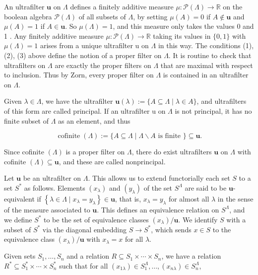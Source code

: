 \documentclass[10pt]{article}
\begin{document}
An ultrafilter $\mathbf{u}$ on $\Lambda$ defines a finitely additive measure $\mu: \mathcal{P}(\Lambda) \rightarrow \mathbb{R}$ on the boolean algebra $\mathcal{P}(\Lambda)$ of all subsets of $\Lambda$, by setting $\mu(A)=0$ if $A \notin \mathbf{u}$ and $\mu(A)=1$ if $A \in \mathbf{u}$. So $\mu(\Lambda)=1$, and this measure only takes the values 0 and 1 . Any finitely additive measure $\mu: \mathcal{P}(\Lambda) \rightarrow \mathbb{R}$ taking its values in $\{0,1\}$ with $\mu(\Lambda)=1$ arises from a unique ultrafilter u on $\Lambda$ in this way. The conditions (1), (2), (3) above define the notion of a proper filter on $\Lambda$. It is routine to check that ultrafilters on $\Lambda$ are exactly the proper filters on $\Lambda$ that are maximal with respect to inclusion. Thus by Zorn, every proper filter on $\Lambda$ is contained in an ultrafilter on $\Lambda$.

Given $\lambda \in \Lambda$, we have the ultrafilter $\mathbf{u}(\lambda):=\{A \subseteq \Lambda \mid \lambda \in A\}$, and ultrafilters of this form are called principal. If an ultrafilter u on $\Lambda$ is not principal, it has no finite subset of $\Lambda$ as an element, and thus

$$
\operatorname{cofinite}(\Lambda):=\{A \subseteq \Lambda \mid \Lambda \backslash A \text { is finite }\} \subseteq \mathbf{u} .
$$

Since cofinite $(\Lambda)$ is a proper filter on $\Lambda$, there do exist ultrafilters $\mathbf{u}$ on $\Lambda$ with cofinite $(\Lambda) \subseteq \mathbf{u}$, and these are called nonprincipal.

Let $\mathbf{u}$ be an ultrafilter on $\Lambda$. This allows us to extend functorially each set $S$ to a set $S^{*}$ as follows. Elements $\left(x_{\lambda}\right)$ and $\left(y_{\lambda}\right)$ of the set $S^{\Lambda}$ are said to be $\mathbf{u}$-equivalent if $\left\{\lambda \in \Lambda \mid x_{\lambda}=y_{\lambda}\right\} \in \mathbf{u}$, that is, $x_{\lambda}=y_{\lambda}$ for almost all $\lambda$ in the sense of the measure associated to $\mathbf{u}$. This defines an equivalence relation on $S^{\Lambda}$, and we define $S^{*}$ to be the set of equivalence classes $\left(x_{\lambda}\right) / \mathbf{u}$. We identify $S$ with a subset of $S^{*}$ via the diagonal embedding $S \rightarrow S^{*}$, which sends $x \in S$ to the equivalence class $\left(x_{\lambda}\right) / \mathbf{u}$ with $x_{\lambda}=x$ for all $\lambda$.

Given sets $S_{1}, \ldots, S_{n}$ and a relation $R \subseteq S_{1} \times \cdots \times S_{n}$, we have a relation $R^{*} \subseteq S_{1}^{*} \times \cdots \times S_{n}^{*}$ such that for all $\left(x_{1 \lambda}\right) \in S_{1}^{\Lambda}, \ldots,\left(x_{n \lambda}\right) \in S_{n}^{\Lambda}$,
\end{document}
